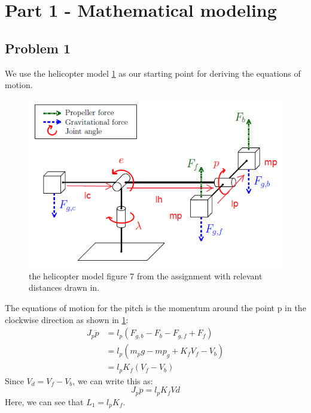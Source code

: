 
\section{Part 1 - Mathematical modeling}
\subsection{Problem 1}

We use the helicopter model \cref{fig:helicopter_model} as our starting point for deriving the equations of motion.
\begin{figure}[hbp]
\caption{the helicopter model figure 7 from the assignment \cite[p.12]{assignment} with relevant distances drawn in.}
\label{fig:helicopter_model}
\includegraphics[width=\textwidth]{images/helicopter_model}
\end{figure}

The equations of motion for the pitch is the momentum around the point p in the clockwise direction as shown in \cref{fig:helicopter_model}:
\begin{align*}
J_p\ddot{p} &= l_p(F_{g,b} - F_b - F_{g,f} + F_f) \\
						&= l_p(m_pg - mp_g + K_fV_f - V_b) \\
						&= l_pK_f(V_f-V_b)
\end{align*}
Since $V_d = V_f-V_b$, we can write this as:
\begin{equation}
J_p\ddot{p} = l_pK_fVd
\end{equation}
Here, we can see that $L_1 = l_pK_f$.

